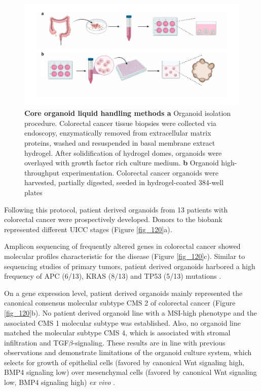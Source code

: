 \begin{flushleft}
\begin{figure}[h!]
\centering
\includegraphics[width=\textwidth,
                height=\textheight,
                keepaspectratio]{figures/promise/pdf/fig_0_1.pdf}
\caption[Core organoid liquid handling methods]{\textbf{Core organoid liquid handling methods a} Organoid isolation procedure. Colorectal cancer tissue biopsies were collected via endoscopy, enzymatically removed from extracellular matrix proteins, washed and resuspended in basal membrane extract hydrogel. After solidification of hydrogel domes, organoids were overlayed with growth factor rich culture medium. \textbf{b} Organoid high-throughput experimentation. Colorectal cancer organoids were harvested, partially digested, seeded in hydrogel-coated 384-well plates}
\label{fig_110}
\end{figure}

\newpage
Following this protocol, patient derived organoids from 13 patients with colorectal cancer were prospectively developed. Donors to the biobank represented different UICC stages (Figure \ref{fig_120}a). 

\bigbreak
Amplicon sequencing of frequently altered genes in colorectal cancer showed molecular profiles characteristic for the disease (Figure \ref{fig_120}c). Similar to sequencing studies of primary tumors, patient derived organoids harbored a high frequency of APC (6/13), KRAS (8/13) and TP53 (5/13) mutations \citep{Muzny2012-hr}. 

\bigbreak
On a gene expression level, patient derived organoids mainly represented the canonical consensus molecular subtype CMS 2 of colorectal cancer \citep{Guinney2015-ex} (Figure \ref{fig_120}b). No patient derived organoid line with a MSI-high phenotype and the associated CMS 1 molecular subtype was established. Also, no organoid line matched the molecular subtype CMS 4, which is associated with stromal infiltration and TGF\(\beta\)-signaling. These results are in line with previous observations \citep{Van_De_Wetering2015-ko, Schutte2017-fl} and demonstrate limitations of the organoid culture system, which selects for growth of epithelial cells (favored by canonical Wnt signaling high, BMP4 signaling low) over mesenchymal cells (favored by canonical Wnt signaling low, BMP4 signaling high) \textit{ex vivo} \citep{Sato2011-lh}.


\end{flushleft}

